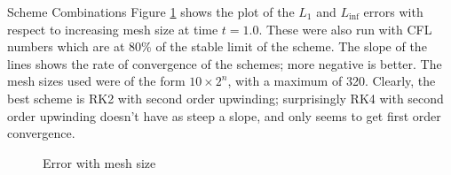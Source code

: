 \documentclass{article}
\begin{document}
\begin{section}{Scheme Combinations}
Figure \ref{space_errs} shows the plot of the $L_1$ and $L_{\inf}$ errors
with respect to increasing mesh size at time $t = 1.0$.
These were also run with CFL numbers which are at $80\%$ of the stable limit of the scheme.
The slope of the lines shows the rate of convergence of the schemes; more negative is better.
The mesh sizes used were of the form $10 \times 2^n$, with a maximum of 320.
Clearly, the best scheme is RK2 with second order upwinding;
surprisingly RK4 with second order upwinding doesn't have as steep a slope,
and only seems to get first order convergence.

\begin{figure}[ht]
  \caption{Error with mesh size}
  \label{space_errs}
\end{figure}
\end{section}
\end{document}
